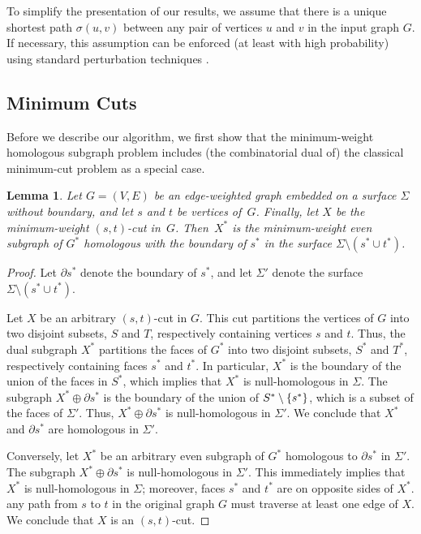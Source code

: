 \documentclass{sig-alternate}
\def\note#1{\EMPH{\color{red} #1}}
\newtheorem{lemma}[theorem]{Lemma}
\begin{document}
To simplify the presentation of our results, we assume that there is a unique shortest path $\sigma(u,v)$ between any pair of vertices $u$ and $v$ in the input graph $G$.  If necessary, this assumption can be enforced (at least with high probability) using standard perturbation techniques \cite{mvv-memi-87}.




\subsection{Minimum Cuts}

Before we describe our algorithm, we first show that the minimum-weight homologous subgraph problem includes (the combinatorial dual of) the classical minimum-cut problem as a special case.

\begin{lemma}
Let $G=(V,E)$ be an edge-weighted graph embedded on a surface $\Sigma$ without boundary, and let $s$ and $t$ be vertices of~$G$.  Finally, let $X$ be the minimum-weight $(s,t)$-cut in~$G$.  Then~$X^*$ is the minimum-weight even subgraph of $G^*$ homologous with the boundary of $s^*$ in the surface $\Sigma\setminus(s^*\cup t^*)$.
\end{lemma}

\begin{proof}
Let $\partial s^*$ denote the boundary of $s^*$, and let $\Sigma'$ denote the surface $\Sigma\setminus {(s^*\cup t^*)}$.

Let $X$ be an arbitrary $(s,t)$-cut in $G$.  This cut partitions the vertices of $G$ into two disjoint subsets, $S$ and $T$, respectively containing vertices $s$ and $t$.  Thus, the dual subgraph $X^*$ partitions the faces of $G^*$ into two disjoint subsets, $S^*$ and $T^*$, respectively containing faces $s^*$ and $t^*$.  In particular, $X^*$ is the boundary of the union of the faces in $S^*$, which implies that $X^*$ is null-homologous in $\Sigma$.  The subgraph $X^* \oplus \partial s^*$ is the boundary of the union of $S^* \setminus\{ s^* \}$, which is a subset of the faces of $\Sigma'$.  Thus,  $X^*\oplus \partial s^*$ is null-homologous in $\Sigma'$.  We conclude that $X^*$ and  $\partial s^*$ are homologous in $\Sigma'$.

Conversely, let $X^*$ be an arbitrary even subgraph of $G^*$ homologous to $\partial s^*$ in $\Sigma'$.  The subgraph $X^*\oplus \partial s^*$ is null-homologous in $\Sigma'$.  This immediately implies that $X^*$ is null-homologous in $\Sigma$; moreover, faces $s^*$ and $t^*$ are on opposite sides of $X^*$.   any path from $s$ to $t$ in the original graph $G$ must traverse at least one edge of $X$.  We conclude that $X$ is an $(s,t)$-cut.
\end{proof}
\end{document}
